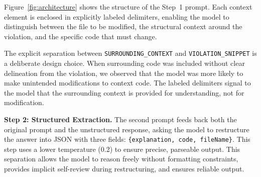 \documentclass[conference]{IEEEtran}
\begin{document}
Figure~\ref{fig:architecture} shows the structure of the Step~1 
prompt. Each context element is enclosed in explicitly labeled 
delimiters, enabling the model to distinguish between the file to be 
modified, the structural context around the violation, and the specific 
code that must change.

The explicit separation between 
\texttt{SURROUNDING\_CONTEXT} and \texttt{VIOLATION\_SNIPPET} is a 
deliberate design choice. When surrounding code was included without 
clear delineation from the violation, we observed that the model was 
more likely to make unintended modifications to context code. The 
labeled delimiters signal to the model that the surrounding context 
is provided for understanding, not for modification.


\textbf{Step 2: Structured Extraction.} The second prompt feeds back both the original prompt and the unstructured response, asking the model to restructure the answer into JSON with three fields: \texttt{\{explanation, code, fileName\}}. This step uses a lower temperature (0.2) to ensure precise, parseable output.
This separation allows the model to reason freely without formatting constraints, provides implicit self-review during restructuring, and ensures reliable output.
\end{document}
